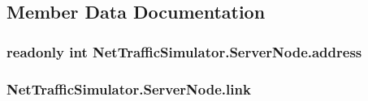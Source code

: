 \subsection{Member Data Documentation}
\hypertarget{classNetTrafficSimulator_1_1ServerNode_a8be317d1e315710190755e4560fea3ef}{
\subsubsection[{address}]{\setlength{\rightskip}{0pt plus 5cm}readonly int Net\-Traffic\-Simulator.\-Server\-Node.\-address\hspace{0.3cm}{\ttfamily [private]}}}\label{classNetTrafficSimulator_1_1ServerNode_a8be317d1e315710190755e4560fea3ef}
\hypertarget{classNetTrafficSimulator_1_1ServerNode_a3968056516ee0dcb5ae111d09464efe6}{
\subsubsection[{link}]{ Net\-Traffic\-Simulator.\-Server\-Node.\-link\hspace{0.3cm}{\ttfamily [private]}}}\label{classNetTrafficSimulator_1_1ServerNode_a3968056516ee0dcb5ae111d09464efe6}


